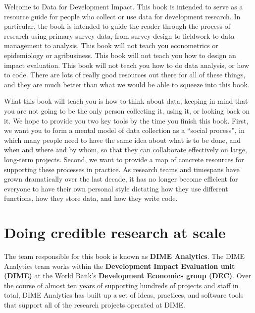 \begin{fullwidth}
Welcome to Data for Development Impact.
This book is intended to serve as a resource guide
for people who collect or use data for development research.
In particular, the book is intended to guide the reader
through the process of research using primary survey data,
from survey design to fieldwork to data management to analysis.
This book will not teach you econometrics or epidemiology or agribusiness.
This book will not teach you how to design an impact evaluation.
This book will not teach you how to do data analysis, or how to code.
There are lots of really good resources out there for all of these things,
and they are much better than what we would be able to squeeze into this book.

What this book will teach you is how to think about data,
keeping in mind that you are not going to be the only person
collecting it, using it, or looking back on it.
We hope to provide you two key tools by the time you finish this book.
First, we want you to form a mental model of data collection as a ``social process'',
in which many people need to have the same idea about what is to be done, and when and where and by whom,
so that they can collaborate effectively on large, long-term projects.
Second, we want to provide a map of concrete resources for supporting these processes in practice.
As research teams and timespans have grown dramatically over the last decade,
it has no longer become efficient for everyone to have their own personal style
dictating how they use different functions, how they store data, and how they write code.
\end{fullwidth}


\section{Doing credible research at scale}

The team responsible for this book is known as \textbf{DIME Analytics}.
The DIME Analytics team works within the \textbf{Development Impact Evaluation unit (DIME)}
at the World Bank's \textbf{Development Economics group (DEC)}.
Over the course of almost ten years of supporting hundreds of projects and staff in total,
DIME Analytics has built up a set of ideas, practices, and software tools
that support all of the research projects operated at DIME.

